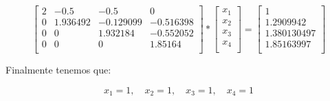     \[
        \begin{bmatrix}
            2 & -0.5 & -0.5 & 0\\
            0 & 1.936492 & -0.129099 & -0.516398\\
            0 & 0 & 1.932184 & -0.552052 \\
            0 & 0 & 0 & 1.85164\\
        \end{bmatrix} * 
        \begin{bmatrix}
            x_1\\ x_2\\ x_3\\ x_4\\
        \end{bmatrix} = 
        \begin{bmatrix}
            1 \\ 1.2909942 \\ 1.380130497 \\ 1.85163997 \\
        \end{bmatrix}
    \]
    
    Finalmente tenemos que:
    
    $$
    x_1 = 1, \quad x_2 = 1, \quad x_3 = 1, \quad x_4 = 1
    $$